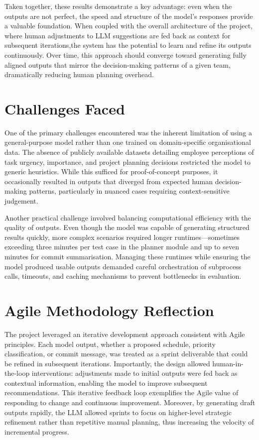 \documentclass{report}
\begin{document}
Taken together, these results demonstrate a key advantage: even when the outputs are not perfect, the speed and structure of the model's responses provide a valuable foundation. 
When coupled with the overall architecture of the project, where human adjustments to LLM suggestions are fed back as context for subsequent iterations,the system has the potential to learn and refine its outputs continuously. 
Over time, this approach should converge toward generating fully aligned outputs that mirror the decision-making patterns of a given team, dramatically reducing human planning overhead.

\section{Challenges Faced}

One of the primary challenges encountered was the inherent limitation of using a general-purpose model rather than one trained on domain-specific organisational data. The absence of publicly available datasets detailing employee perceptions of task urgency, importance, and project planning decisions restricted the model to generic heuristics. While this sufficed for proof-of-concept purposes, it occasionally resulted in outputs that diverged from expected human decision-making patterns, particularly in nuanced cases requiring context-sensitive judgement.

Another practical challenge involved balancing computational efficiency with the quality of outputs. Even though the model was capable of generating structured results quickly, more complex scenarios required longer runtimes—sometimes exceeding three minutes per test case in the planner module and up to seven minutes for commit summarisation. Managing these runtimes while ensuring the model produced usable outputs demanded careful orchestration of subprocess calls, timeouts, and caching mechanisms to prevent bottlenecks in evaluation.

\section{Agile Methodology Reflection}

The project leveraged an iterative development approach consistent with Agile principles. Each model output, whether a proposed schedule, priority classification, or commit message, was treated as a sprint deliverable that could be refined in subsequent iterations. Importantly, the design allowed human-in-the-loop interventions: adjustments made to initial outputs were fed back as contextual information, enabling the model to improve subsequent recommendations. This iterative feedback loop exemplifies the Agile value of responding to change and continuous improvement. Moreover, by generating draft outputs rapidly, the LLM allowed sprints to focus on higher-level strategic refinement rather than repetitive manual planning, thus increasing the velocity of incremental progress.
\end{document}
